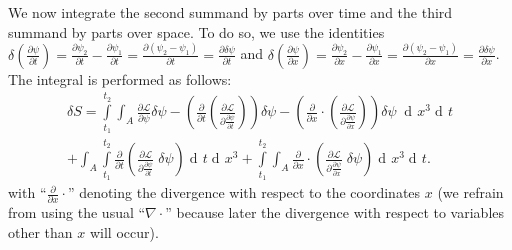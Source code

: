 \documentclass[prb,preprint]{revtex4-1}
\DeclareMathOperator{\dd}{d\!}
\begin{document}
We now integrate the second summand by parts over time and the third summand by parts over space.
To do so, we use the identities
$\delta \left(\frac{\partial \psi} {\partial t}\right)
= \frac{\partial \psi_2} {\partial t} - \frac{\partial \psi_1} {\partial t}
= \frac{\partial (\psi_2 - \psi_1)} {\partial t}
= \frac{\partial \delta \psi} {\partial t}$ 
and
$\delta \left(\frac{\partial \psi} {\partial x}\right)
= \frac{\partial \psi_2} {\partial x} - \frac{\partial \psi_1} {\partial x}
= \frac{\partial (\psi_2 - \psi_1)} {\partial x}
= \frac{\partial \delta \psi} {\partial x}$.
The integral is performed as follows:
\begin{equation} \label{calcDeltaSSection2}
\begin{split}
\delta S = \int\limits_{t_1}^{t_2} \int_{A} 
\frac{\partial \mathcal{L}}{\partial \psi} \delta \psi
-\left(\frac{\partial}{\partial t} \left( \frac{\partial \mathcal{L}}{\partial \frac{\partial \psi}{\partial t}} \right)\right) \delta \psi
-\left(\frac{\partial}{\partial x} \cdot \left( \frac{\partial \mathcal{L}}{\partial \frac{\partial \psi}{\partial x}} \right)\right) \delta \psi \;
\dd x^3 \dd t \\
+ \int_{A} \int\limits_{t_1}^{t_2} \frac{\partial}{\partial t} \left(\frac{\partial \mathcal{L}}{\partial \frac{\partial \psi}{\partial t}} \; \delta \psi \right) \dd t \dd x^3
+ \int\limits_{t_1}^{t_2} 
\int_{A} \frac{\partial}{\partial x} \cdot \left( \frac{\partial \mathcal{L}}{\partial \frac{\partial \psi}{\partial x}} \; \delta \psi \right) \dd x^3  \dd t.
\end{split}
\end{equation}
with ``$\frac{\partial}{\partial x} \cdot$'' denoting the divergence with respect to the coordinates $x$ (we refrain from using the usual ``$\nabla \cdot$'' because later the divergence with respect to variables other than $x$ will occur).
\end{document}
